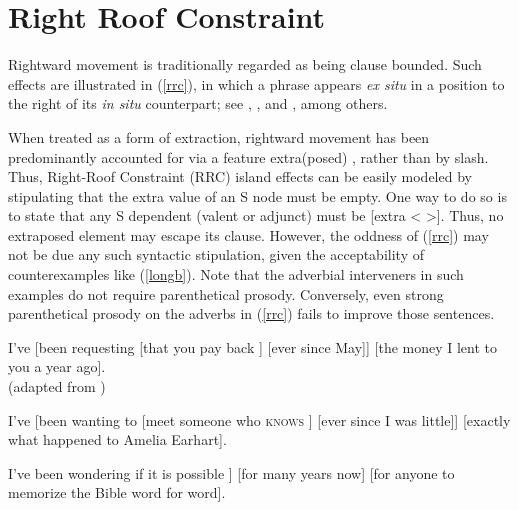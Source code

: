 \documentclass[output=paper
 	        ,biblatex
                ,babelshorthands
                ,newtxmath
                ,draftmode
                ,colorlinks, citecolor=brown
]{langscibook}
\begin{document}
\section{Right Roof Constraint}

Rightward movement is traditionally regarded as being clause bounded. Such
 \emph{}  \citep[Section~5.1.2]{Ross67} effects are illustrated in (\ref{rrc}), 
in which a phrase appears \emph{ex situ} in a position 
to the right of its \emph{in situ} counterpart; see   \citet{akma75}, \citet{baltin78}, and  \citet{stowelldiss}, among others.

\eal \label{rrc}
\ex[*]{It was believed \spc$_x$ that $[$there walked into the room$]$ \spc$_y$ $[$by everyone$]_x$ $[$a man with  long blond hair$]_y$].\\
\citep{rochemont}}
\zl



\noindent
When treated as a form of extraction, rightward movement has been predominantly
accounted for via a feature {\sc extra(posed)} \citep{Keller95b,Bouma96,eynde96,
kellerverb,Mueller99a,KimSag2005}, rather than by {\sc slash}.  
Thus, Right-Roof Constraint (RRC) island effects can be easily modeled by stipulating that the  {\sc extra} value of an S node must be empty. One way to do so is to state that any S dependent (valent or adjunct) must be [{\sc extra} < >].
Thus, no extraposed element may escape its clause. However,  the oddness of (\ref{rrc}) may not be due any such syntactic stipulation, given the acceptability of counterexamples like (\ref{longb}). Note that the adverbial interveners in such examples do not  require parenthetical prosody. Conversely, even strong  parenthetical
prosody on the adverbs in (\ref{rrc}) fails to improve those sentences.


\eal \label{longb}
\ex  I've [been requesting [that you pay back \spc] [ever since May]] [the money
I lent to you a year ago].\\
  (adapted from \citealp[167]{Kayne98a-u})

\ex I've [been wanting to [meet someone
who \textsc{knows} \spc] [ever since I was little]] [exactly what happened to Amelia Earhart].

\ex  I've been wondering  if it is possible   \spc]
[for many years now] [for anyone to memorize the Bible word for word].\\
\citep[861]{chavesrnr}
\zl
\end{document}
